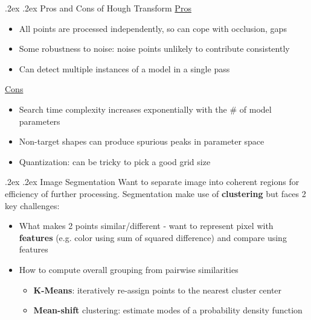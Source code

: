 \documentclass[landscape,a4paper]{article}
\makeatletter
\renewcommand{\section}{\@startsection{section}{1}{0mm}%
	{.2ex}%
	{.2ex}%
	{\color{myblue}\sffamily\scriptsize\bfseries}}
\renewcommand{\subsection}{\@startsection{subsection}{1}{0mm}%
	{.2ex}%
	{.2ex}%
	{\sffamily\bfseries}}
\makeatother
\begin{document}
\begin{multicols*}{4}
	\subsection{Pros and Cons of Hough Transform}
	\underline{Pros}
	\begin{itemize}
		\item All points are processed independently, so can cope with occlusion, gaps
		\item Some robustness to noise: noise points unlikely to contribute consistently
		\item Can detect multiple instances of a model in a single pass
	\end{itemize}
	\underline{Cons}
	\begin{itemize}
		\item Search time complexity increases exponentially with the \# of model parameters
		\item Non-target shapes can produce spurious peaks in parameter space
		\item Quantization: can be tricky to pick a good grid size
	\end{itemize}
	\section{Image Segmentation}
	Want to separate image into coherent regions for efficiency of further processing. Segmentation make use of \textbf{clustering} but faces 2 key challenges:
	\begin{itemize}
		\item What makes 2 points similar/different - want to represent pixel with \textbf{features} (e.g. color using sum of squared difference) and compare using features
		\item How to compute overall grouping from pairwise similarities
		\begin{itemize}
			\item \textbf{K-Means}: iteratively re-assign points to the nearest cluster center
			\item \textbf{Mean-shift} clustering: estimate modes of a probability density function
		\end{itemize}
	\end{itemize}

\end{multicols*}
\end{document}
